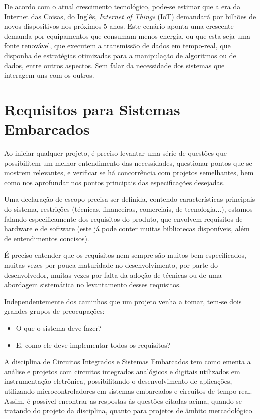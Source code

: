 \documentclass[
	12pt,				%
	openright,			%
  oneside,     %
	a4paper,			%
	english,			%
	french,				%
	spanish,			%
	brazil				%
	]{abntex2}
\begin{document}
De acordo com o atual crescimento tecnológico, pode-se estimar que a era da Internet das Coisas, do Inglês, \textit{Internet of Things} (IoT) demandará por bilhões de novos dispositivos nos próximos 5 anos. Este cenário aponta uma crescente demanda por equipamentos que consumam menos energia, ou que esta seja uma fonte renovável, que executem a transmissão de dados em tempo-real, que disponha de estratégias otimizadas para a manipulação de algoritmos ou de dados, entre outros aspectos. Sem falar da necessidade dos sistemas que interagem uns com os outros.


\section*{Requisitos para Sistemas Embarcados} %
\label{sec:requisitos}

Ao iniciar qualquer projeto, é preciso levantar uma série de questões que possibilitem um melhor entendimento das necessidades, questionar pontos que se mostrem relevantes, e verificar se há concorrência com projetos semelhantes, bem como nos aprofundar nos pontos principais das especificações desejadas.

Uma declaração de escopo precisa ser definida, contendo características principais do sistema, restrições (técnicas, financeiras, comerciais, de tecnologia...), estamos falando especificamente dos requisitos do produto, que envolvem requisitos de hardware e de software (este já pode conter muitas bibliotecas disponíveis, além de entendimentos concisos).

É preciso entender que os requisitos nem sempre são muitos bem especificados, muitas vezes por pouca maturidade no desenvolvimento, por parte do desenvolvedor, muitas vezes por falta da adoção de técnicas ou de uma abordagem sistemática no levantamento desses requisitos.

Independentemente dos caminhos que um projeto venha a tomar, tem-se dois grandes grupos de preocupações:

\begin{itemize}
    \item O que o sistema deve fazer?
    \item E, como ele deve implementar todos os requisitos?
\end{itemize}

A disciplina de Circuitos Integrados e Sistemas Embarcados tem como ementa a análise e projetos com circuitos integrados analógicos e digitais utilizados em instrumentação eletrônica, possibilitando o desenvolvimento de aplicações, utilizando microcontroladores em sistemas embarcados e circuitos de tempo real. Assim, é possível encontrar as respostas às questões citadas acima, quando se tratando do projeto da disciplina, quanto para projetos de âmbito mercadológico.
\end{document}
